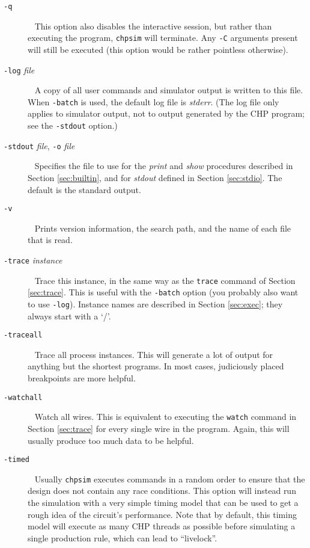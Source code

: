 \begin{description}
\item[{\tt{}-q}] \ \linebreak
This option also disables the interactive session, but rather than executing
the program, \verb|chpsim| will terminate.  Any \verb|-C| arguments present
will still be executed (this option would be rather pointless otherwise).

\item[{\tt{}-log} {\it{}file}] \ \linebreak
A copy of all user commands and simulator output
is written to this file. When \verb|-batch| is used, the default log file is
{\it{}stderr}. (The log file only applies to simulator output, not to output
generated by the CHP program; see the \verb|-stdout| option.)

\item[{\tt{}-stdout} {\it{}file}, {\tt{}-o} {\it{}file}] \ \linebreak
Specifies the file to use for the {\it{}print} and {\it{}show}
procedures described in Section \ref{sec:builtin}, and for {\it{}stdout} defined
in Section \ref{sec:stdio}. The default is the standard output.

\item[{\tt{}-v}] \ \linebreak
Prints version information, the search path, and the name
of each file that is read.

\item[{\tt{}-trace} {\it{}instance}] \ \linebreak
Trace this instance, in the same way as
the \verb|trace| command of Section \ref{sec:trace}. This is useful with the
\verb|-batch| option (you probably also want to use \verb|-log|). Instance names
are described in Section \ref{sec:exec}; they always start with a `/'.

\item[{\tt{}-traceall}] \ \linebreak
Trace all process instances. This will generate a
lot of output for anything but the shortest programs. In most cases,
judiciously placed breakpoints are more helpful.

\item[{\tt{}-watchall}] \ \linebreak
Watch all wires.  This is equivalent to executing the \verb|watch| command in
Section \ref{sec:trace} for every single wire in the program. Again, this will
usually produce too much data to be helpful.

\item[{\tt{}-timed}] \ \linebreak
Usually \verb|chpsim| executes commands in a random order to ensure that the
design does not contain any race conditions.  This option will instead run the
simulation with a very simple timing model that can be used to get a rough
idea of the circuit's performance.  Note that by default, this timing model
will execute as many CHP threads as possible before simulating a single
production rule, which can lead to ``livelock''.


\end{description}
